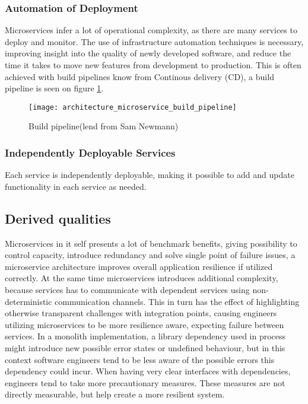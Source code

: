 \subsubsection*{Automation of Deployment}
Microservices infer a lot of operational complexity, as there are many services to deploy and monitor. The use of infrastructure automation techniques is necessary, improving insight into the quality of newly developed software, and reduce the time it takes to move new features from development to production\cite{newman2015microservices}. This is often achieved with build pipelines know from Continous delivery (CD), a build pipeline is seen on figure \ref{fig:architecture_microservice_build_pipeline}.

\begin{figure}[!htb]
  \texttt{[image: architecture\_microservice\_build\_pipeline]}  
  \caption{Build pipeline(lend from Sam Newmann)}
  \label{fig:architecture_microservice_build_pipeline}
\end{figure}

\subsubsection*{Independently Deployable Services}
Each service is independently deployable, making it possible to add and update functionality in each service as needed.

\subsection{Derived qualities}
Microservices in it self presents a lot of benchmark benefits, giving possibility to control capacity, introduce redundancy and solve single point of failure issues, a microservice architecture improves overall application resilience if utilized correctly. At the same time microservices introduces additional complexity, because services has to communicate with dependent services using non-deterministic communication channels. This in turn has the effect of highlighting otherwise transparent challenges with integration points, causing engineers utilizing microservices to be more resilience aware, expecting failure between services. In a monolith implementation, a library dependency used in process might introduce new possible error states or undefined behaviour, but in this context software engineers tend to be less aware of the possible errors this dependency could incur. When having very clear interfaces with dependencies, engineers tend to take more precautionary measures. These measures are not directly measurable, but help create a more resilient system. 


